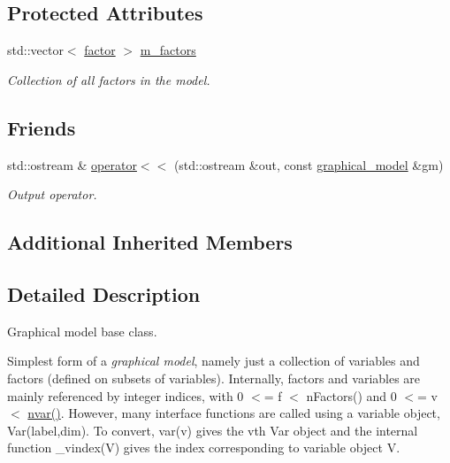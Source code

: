 \subsection*{Protected Attributes}
\begin{DoxyCompactItemize}
\item 
\hypertarget{classmerlin_1_1graphical__model_aecae0801175e5752efc53146f9c7030e}{}std\+::vector$<$ \hyperlink{classmerlin_1_1factor}{factor} $>$ \hyperlink{classmerlin_1_1graphical__model_aecae0801175e5752efc53146f9c7030e}{m\+\_\+factors}\label{classmerlin_1_1graphical__model_aecae0801175e5752efc53146f9c7030e}

\begin{DoxyCompactList}\small\item\em Collection of all factors in the model. \end{DoxyCompactList}\end{DoxyCompactItemize}
\subsection*{Friends}
\begin{DoxyCompactItemize}
\item 
std\+::ostream \& \hyperlink{classmerlin_1_1graphical__model_ab797c308605a6f3098645515dfe2ddc0}{operator$<$$<$} (std\+::ostream \&out, const \hyperlink{classmerlin_1_1graphical__model}{graphical\+\_\+model} \&gm)
\begin{DoxyCompactList}\small\item\em Output operator. \end{DoxyCompactList}\end{DoxyCompactItemize}
\subsection*{Additional Inherited Members}


\subsection{Detailed Description}
Graphical model base class. 

Simplest form of a {\itshape graphical model}, namely just a collection of variables and factors (defined on subsets of variables). Internally, factors and variables are mainly referenced by integer indices, with 0 $<$= f $<$ n\+Factors() and 0 $<$= v $<$ \hyperlink{classmerlin_1_1graphical__model_af70ee4f7a4414fac4f7568e3c0e5efca}{nvar()}. However, many interface functions are called using a variable object, Var(label,dim). To convert, var(v) gives the vth Var object and the internal function \+\_\+vindex(\+V) gives the index corresponding to variable object V. 

